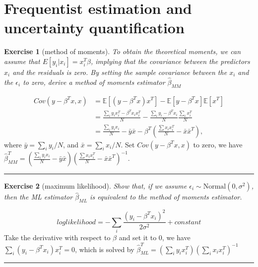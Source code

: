 \documentclass[twoside]{article}
\newcounter{lecnum}
\newtheorem{exercise}{Exercise}[lecnum]
\newenvironment{proof}{{\bf Proof:}}{\hfill\rule{2mm}{2mm}}
\newcommand\E{\mathbb{E}}
\begin{document}
  

\section{Frequentist estimation and uncertainty quantification}

\begin{exercise}[method of moments]
  To obtain the theoretical moments, we can assume that $E[y_i|x_i] = x_i^T\beta$, implying that the covariance between the predictors $x_i$ and the residuals is zero. By setting the sample covariance between the $x_i$ and the $\epsilon_i$ to zero, derive a method of moments estimator $\hat{\beta}_{MM}$
\end{exercise}
\begin{proof}
\begin{equation}
\begin{split}
Cov(y-\beta^Tx, x) &= \E[(y-\beta^Tx)x^T]-\E[y-\beta^Tx]\E[x^T]\\
& = \frac{\sum_iy_ix_i^T - \beta^Tx_ix_i^T}{N}-\frac{\sum_iy_i-\beta^Tx_i}{N}\frac{\sum_ix_i^T}{N}\\
& = \frac{\sum_iy_ix_i}{N}-\bar{y}\bar{x} - \beta^T(\frac{\sum x_ix_i^T}{N}-\bar{x}\bar{x}^T),
\end{split}
\end{equation}
where $\bar{y} = \sum_i y_i/N$, and $\bar{x} = \sum_i x_i/N.$
Set $Cov(y-\beta^Tx,x)$ to zero, we have $\hat{\beta}_{MM}^T= (\frac{\sum_iy_ix_i}{N}-\bar{y}\bar{x})(\frac{\sum x_ix_i^T}{N}-\bar{x}\bar{x}^T)^{-1}.$
\end{proof}
\begin{exercise}[maximum likelihood]
  Show that, if we assume $\epsilon_i\sim \mbox{Normal}(0,\sigma^2)$, then the ML estimator $\hat{\beta}_{ML}$ is equivalent to the method of moments estimator.
\end{exercise}

\begin{proof}
\begin{equation}loglikelihood = -\sum_i \frac{(y_i-\beta^Tx_i)^2}{2\sigma^2} + constant\label{likelihood}
\end{equation}
Take the derivative with respect to $\beta$ and set it to $0$, we have $\sum_i(y_i-\beta^Tx_i)x_i^T = 0$, which is solved by $\hat{\beta}_{ML}^T = (\sum_i y_ix_i^T)(\sum_i x_ix_i^T)^{-1}$
\end{proof}
\end{document}
